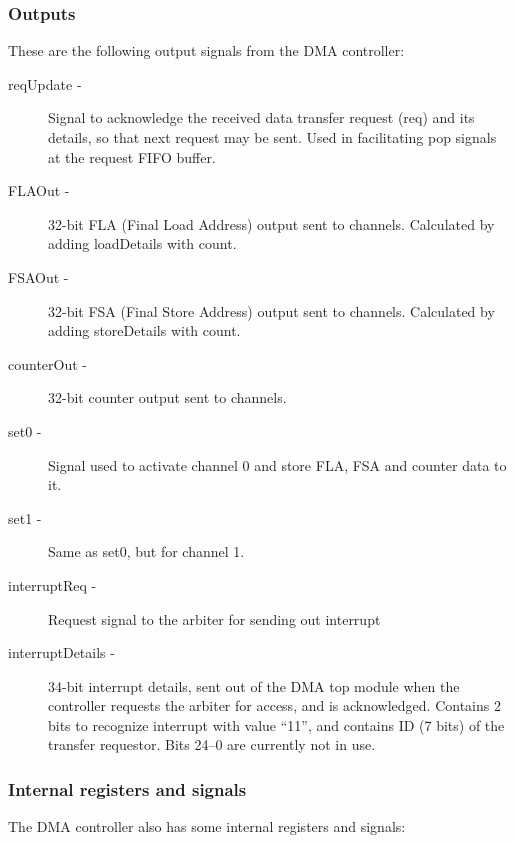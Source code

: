 \begin{appendix}
\subsubsection{Outputs}
These are the following output signals from the DMA controller:

\begin{description}
    \item [reqUpdate -]
    Signal to acknowledge the received data transfer request (req) and its details, so that next request may be sent.
    Used in facilitating pop signals at the request FIFO buffer.
    \item[FLAOut -]
    32-bit FLA (Final Load Address) output sent to channels.
    Calculated by adding loadDetails with count.
    \item[FSAOut -]
    32-bit FSA (Final Store Address) output sent to channels.
    Calculated by adding storeDetails with count.
    \item[counterOut -]
    32-bit counter output sent to channels.
    \item[set0 -]
    Signal used to activate channel 0 and store FLA, FSA and counter data to it.
    \item[set1 -]
    Same as set0, but for channel 1.
    \item[interruptReq -]
    Request signal to the arbiter for sending out interrupt
    \item[interruptDetails -]
    34-bit interrupt details, sent out of the DMA top module when the controller requests the arbiter for access, and is acknowledged.
    Contains 2 bits to recognize interrupt with value ``11'', and contains ID (7 bits) of the transfer requestor.
    Bits 24--0 are currently not in use.
\end{description}

\subsubsection{Internal registers and signals}
The DMA controller also has some internal registers and signals:


\end{appendix}
